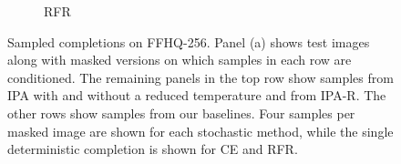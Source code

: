 \begin{figure}[t]
\begin{subfigure}[t]{0.25\textwidth}
      \caption{RFR}
    \end{subfigure}
    \begin{subfigure}[t]{0.16\textwidth}
      \setlength{\fboxrule}{0pt}
      \fbox{
        \begin{minipage}{1in}
          \hfill\hspace{1in}
        \end{minipage}
      }
    \end{subfigure}
    \vspace{-.5cm}
    \caption{Sampled completions on FFHQ-256. Panel (a) shows test images along with
      masked versions on which samples in each row are conditioned. The
      remaining panels in the top row show samples from IPA with and without a
      reduced temperature and from IPA-R. The other rows show samples from our
      baselines. Four samples per masked image are shown for each stochastic
      method, while the single deterministic completion is shown for CE and
      RFR.}
    \vspace{-.5cm}
    \label{fig:cigcvae-ffhq-samples}
  \end{figure}


